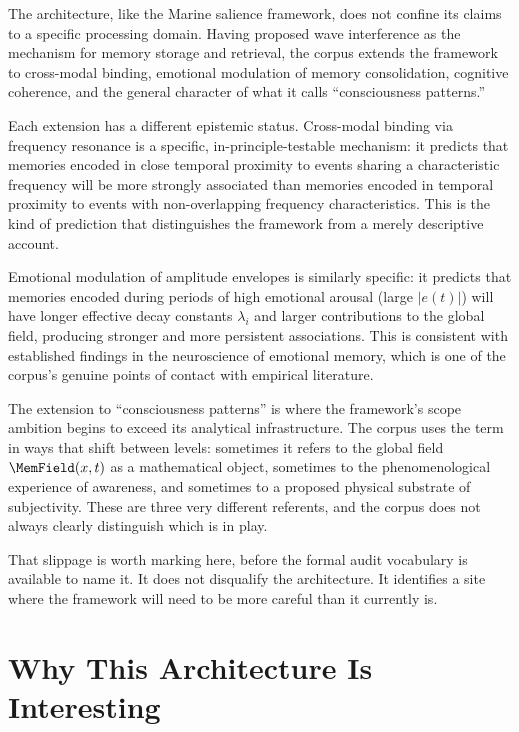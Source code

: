 The \MEMeight{} architecture, like the Marine salience framework,
does not confine its claims to a specific processing domain. Having
proposed wave interference as the mechanism for memory storage and
retrieval, the corpus extends the framework to cross-modal binding,
emotional modulation of memory consolidation, cognitive coherence,
and the general character of what it calls \enquote{consciousness
patterns.}

Each extension has a different epistemic status. Cross-modal binding
via frequency resonance is a specific, in-principle-testable
mechanism: it predicts that memories encoded in close temporal
proximity to events sharing a characteristic frequency will be
more strongly associated than memories encoded in temporal proximity
to events with non-overlapping frequency characteristics. This is
the kind of prediction that distinguishes the framework from a
merely descriptive account.

Emotional modulation of amplitude envelopes is similarly specific:
it predicts that memories encoded during periods of high emotional
arousal (large $|e(t)|$) will have longer effective decay constants
$\lambda_i$ and larger contributions to the global field, producing
stronger and more persistent associations. This is consistent with
established findings in the neuroscience of emotional memory, which
is one of the corpus's genuine points of contact with empirical
literature.

The extension to \enquote{consciousness patterns} is where the
framework's scope ambition begins to exceed its analytical
infrastructure. The corpus uses the term in ways that shift between
levels: sometimes it refers to the global field $\MemField(x,t)$
as a mathematical object, sometimes to the phenomenological
experience of awareness, and sometimes to a proposed physical
substrate of subjectivity. These are three very different referents,
and the corpus does not always clearly distinguish which is in play.

That slippage is worth marking here, before the formal audit
vocabulary is available to name it. It does not disqualify the
architecture. It identifies a site where the framework will need
to be more careful than it currently is.

\section{Why This Architecture Is Interesting}
\label{sec:mem8-interesting}

